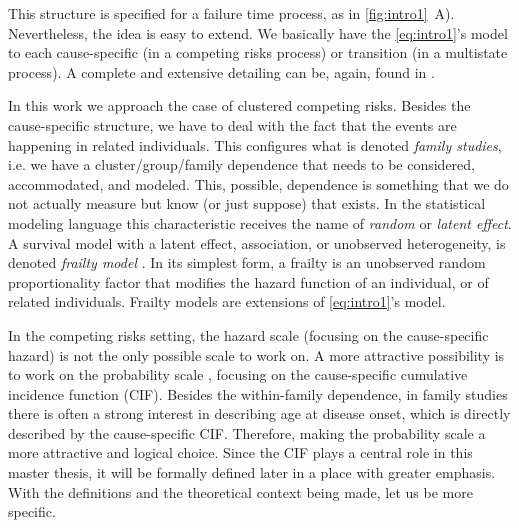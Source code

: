 This structure is specified for a failure time process, as in
\autoref{fig:intro1}~A). Nevertheless, the idea is easy to extend. We
basically have the \autoref{eq:intro1}'s model to each cause-specific
(in a competing risks process) or transition (in a multistate process).
A complete and extensive detailing can be, again, found in
.

In this work we approach the case of clustered competing risks. Besides
the cause-specific structure, we have to deal with the fact that the
events are happening in related individuals. This configures what is
denoted \textit{family studies}, i.e. we have a cluster/group/family
dependence that needs to be considered, accommodated, and modeled. This,
possible, dependence is something that we do not actually measure but
know (or just suppose) that exists. In the statistical modeling language
this characteristic receives the name of \textit{random} or
\textit{latent effect}. A survival model with a latent effect,
association, or unobserved heterogeneity, is denoted
\textit{frailty model} \cite{frailty78, frailty79}. In its simplest
form, a frailty is an unobserved random proportionality factor that
modifies the hazard function of an individual, or of related
individuals. Frailty models are extensions of \autoref{eq:intro1}'s
model.

In the competing risks setting, the hazard scale (focusing on the
cause-specific hazard) is not the only possible scale to work on. A more
attractive possibility is to work on the probability scale
\cite{andersen12}, focusing on the cause-specific cumulative incidence
function (CIF). Besides the within-family dependence, in family studies
there is often a strong interest in describing age at disease onset,
which is directly described by the cause-specific CIF. Therefore, making
the probability scale a more attractive and logical choice. Since the
CIF plays a central role in this master thesis, it will be formally
defined later in a place with greater emphasis. With the definitions and
the theoretical context being made, let us be more specific.

